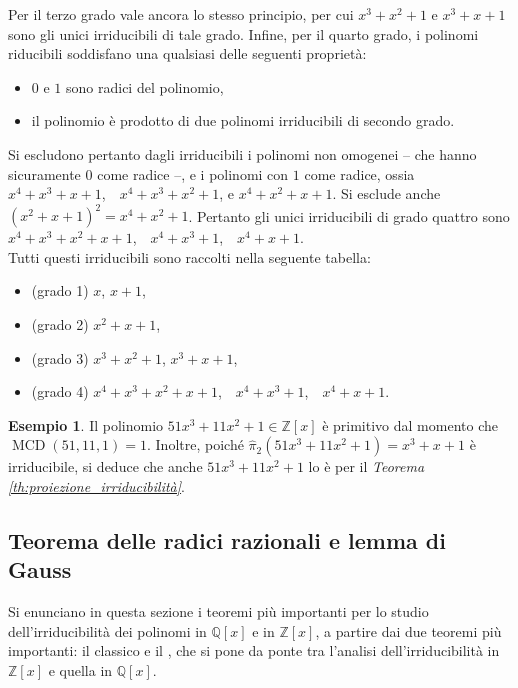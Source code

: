 \documentclass[a4paper]{article}
\newcommand{\QQx}{\mathbb{Q}[x]}
\newcommand{\ZZx}{\mathbb{Z}[x]}
\newcommand{\hatpi}{\hat{\pi}}
\theoremstyle{definition}
\newtheorem{example}{Esempio}[section]
\DeclareMathOperator{\MCD}{MCD}
\begin{document}
Per il terzo grado vale ancora lo stesso principio, per cui
$x^3+x^2+1$ e $x^3+x+1$ sono gli unici irriducibili di tale grado.
Infine, per il quarto grado, i polinomi riducibili soddisfano
una qualsiasi delle seguenti proprietà:

\begin{itemize}
    \item $0$ e $1$ sono radici del polinomio,
    \item il polinomio è prodotto di due polinomi irriducibili di
          secondo grado.
\end{itemize}

Si escludono pertanto dagli irriducibili i polinomi non omogenei --
che hanno sicuramente $0$ come radice --, e i polinomi con $1$ come
radice, ossia $x^4+x^3+x+1$,\ \
$x^4+x^3+x^2+1$, e $x^4+x^2+x+1$. Si esclude anche
$(x^2+x+1)^2 = x^4+x^2+1$. Pertanto gli unici irriducibili di
grado quattro sono $x^4+x^3+x^2+x+1$,\ \ $x^4+x^3+1$,\ \  $x^4+x+1$. \\

Tutti questi irriducibili sono raccolti nella seguente tabella:

\begin{itemize}
    \item (grado 1) $x$, $x+1$,
    \item (grado 2) $x^2+x+1$,
    \item (grado 3) $x^3+x^2+1$, $x^3+x+1$,
    \item (grado 4) $x^4+x^3+x^2+x+1$,\ \ $x^4+x^3+1$,\ \ $x^4+x+1$.
\end{itemize}

\begin{example}
    Il polinomio $51x^3+11x^2+1 \in \ZZx$ è primitivo dal momento
    che $\MCD(51, 11, 1)=1$. Inoltre, poiché $\hatpi_2(51x^3+11x^2+1)=
        x^3+x+1$ è irriducibile, si deduce che anche $51x^3+11x^2+1$ lo
    è per il \textit{Teorema \ref{th:proiezione_irriducibilità}}.
\end{example}

\subsection{Teorema delle radici razionali e lemma di Gauss}

Si enunciano in questa sezione i teoremi più importanti per
lo studio dell'irriducibilità dei polinomi in $\QQx$ e
in $\ZZx$, a partire dai due teoremi più importanti: il
classico  e il ,
che si pone da ponte tra l'analisi dell'irriducibilità in $\ZZx$ e
quella in $\QQx$.
\end{document}
